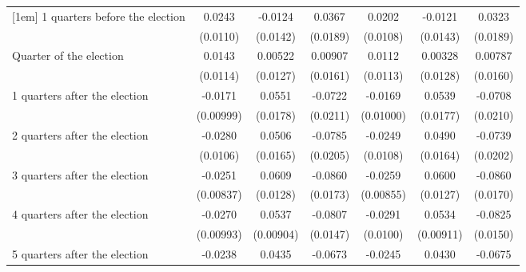 \begin{table}[!ht]
\begin{tabular}{l*{6}{c}}
[1em]
 1 quarters before the election&      0.0243\sym{*}  &     -0.0124         &      0.0367         &      0.0202         &     -0.0121         &      0.0323         \\
                    &    (0.0110)         &    (0.0142)         &    (0.0189)         &    (0.0108)         &    (0.0143)         &    (0.0189)         \\
[1em]
Quarter of the election&      0.0143         &     0.00522         &     0.00907         &      0.0112         &     0.00328         &     0.00787         \\
                    &    (0.0114)         &    (0.0127)         &    (0.0161)         &    (0.0113)         &    (0.0128)         &    (0.0160)         \\
[1em]
 1 quarters after the election&     -0.0171         &      0.0551\sym{**} &     -0.0722\sym{***}&     -0.0169         &      0.0539\sym{**} &     -0.0708\sym{***}\\
                    &   (0.00999)         &    (0.0178)         &    (0.0211)         &   (0.01000)         &    (0.0177)         &    (0.0210)         \\
[1em]
 2 quarters after the election&     -0.0280\sym{**} &      0.0506\sym{**} &     -0.0785\sym{***}&     -0.0249\sym{*}  &      0.0490\sym{**} &     -0.0739\sym{***}\\
                    &    (0.0106)         &    (0.0165)         &    (0.0205)         &    (0.0108)         &    (0.0164)         &    (0.0202)         \\
[1em]
 3 quarters after the election&     -0.0251\sym{**} &      0.0609\sym{***}&     -0.0860\sym{***}&     -0.0259\sym{**} &      0.0600\sym{***}&     -0.0860\sym{***}\\
                    &   (0.00837)         &    (0.0128)         &    (0.0173)         &   (0.00855)         &    (0.0127)         &    (0.0170)         \\
[1em]
 4 quarters after the election&     -0.0270\sym{**} &      0.0537\sym{***}&     -0.0807\sym{***}&     -0.0291\sym{**} &      0.0534\sym{***}&     -0.0825\sym{***}\\
                    &   (0.00993)         &   (0.00904)         &    (0.0147)         &    (0.0100)         &   (0.00911)         &    (0.0150)         \\
[1em]
 5 quarters after the election&     -0.0238\sym{*}  &      0.0435\sym{**} &     -0.0673\sym{***}&     -0.0245\sym{*}  &      0.0430\sym{**} &     -0.0675\sym{***}\\

\end{tabular}
\end{table}
